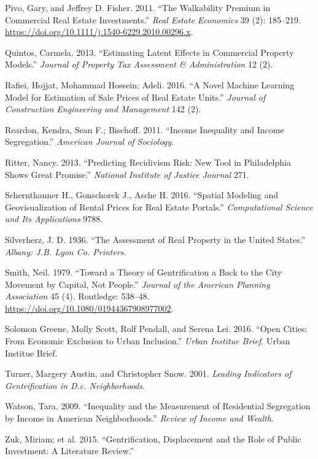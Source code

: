 \documentclass[12pt,]{article}
\begin{document}
\leavevmode\hypertarget{ref-Pivo2011}{}%
Pivo, Gary, and Jeffrey D. Fisher. 2011. ``The Walkability Premium in
Commercial Real Estate Investments.'' \emph{Real Estate Economics} 39
(2): 185--219. \url{https://doi.org/10.1111/j.1540-6229.2010.00296.x}.

\leavevmode\hypertarget{ref-Quintos2013}{}%
Quintos, Carmela. 2013. ``Estimating Latent Effects in Commercial
Property Models.'' \emph{Journal of Property Tax Assessment \&
Administration} 12 (2).

\leavevmode\hypertarget{ref-Rafiei2016}{}%
Rafiei, Hojjat, Mohammad Hossein; Adeli. 2016. ``A Novel Machine
Learning Model for Estimation of Sale Prices of Real Estate Units.''
\emph{Journal of Construction Engineering and Management} 142 (2).

\leavevmode\hypertarget{ref-Reardon2011}{}%
Reardon, Kendra, Sean F.; Bischoff. 2011. ``Income Inequality and Income
Segregation.'' \emph{American Journal of Sociology}.

\leavevmode\hypertarget{ref-Ritter2013}{}%
Ritter, Nancy. 2013. ``Predicting Recidivism Risk: New Tool in
Philadelphia Shows Great Promise.'' \emph{National Institute of Justice
Journal} 271.

\leavevmode\hypertarget{ref-Schernthanner2016}{}%
Schernthanner H., Gonschorek J., Asche H. 2016. ``Spatial Modeling and
Geovisualization of Rental Prices for Real Estate Portals.''
\emph{Computational Science and Its Applications} 9788.

\leavevmode\hypertarget{ref-Silverherz1936}{}%
Silverherz, J. D. 1936. ``The Assessment of Real Property in the United
States.'' \emph{Albany: J.B. Lyon Co. Printers}.

\leavevmode\hypertarget{ref-Smith1979}{}%
Smith, Neil. 1979. ``Toward a Theory of Gentrification a Back to the
City Movement by Capital, Not People.'' \emph{Journal of the American
Planning Association} 45 (4). Routledge: 538--48.
\url{https://doi.org/10.1080/01944367908977002}.

\leavevmode\hypertarget{ref-urban2016}{}%
Solomon Greene, Molly Scott, Rolf Pendall, and Serena Lei. 2016. ``Open
Cities: From Economic Exclusion to Urban Inclusion.'' \emph{Urban
Institue Brief}. Urban Institue Brief.

\leavevmode\hypertarget{ref-Turner2001}{}%
Turner, Margery Austin, and Christopher Snow. 2001. \emph{Leading
Indicators of Gentrification in D.c. Neighborhoods}.

\leavevmode\hypertarget{ref-Watson2009}{}%
Watson, Tara. 2009. ``Inequality and the Measurement of Residential
Segregation by Income in American Neighborhoods.'' \emph{Review of
Income and Wealth}.

\leavevmode\hypertarget{ref-Zuk2015}{}%
Zuk, Miriam; et al. 2015. ``Gentrification, Displacement and the Role of
Public Investment: A Literature Review.''
\end{document}
